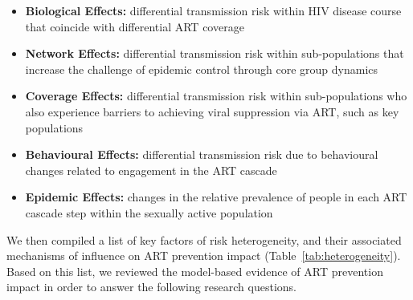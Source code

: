 \begin{itemize}
  \item \textbf{Biological Effects:}
  differential transmission risk within HIV disease course
  that coincide with differential ART coverage
  \cite{Pilcher2004}
  \item \textbf{Network Effects:}
  differential transmission risk within sub-populations
  that increase the challenge of epidemic control through core group dynamics
  \cite{Anderson1986,Boily1997,Watts2010}
  \item \textbf{Coverage Effects:}
  differential transmission risk within sub-populations
  who also experience barriers to achieving viral suppression via ART,
  such as key populations
  \cite{Mountain2014,Lancaster2016,Hakim2018}
  \item \textbf{Behavioural Effects:}
  differential transmission risk due to
  behavioural changes related to engagement in the ART cascade
  \cite{} %
  \item \textbf{Epidemic Effects:}
  changes in the relative prevalence of people in each ART cascade step
  within the sexually active population
  \cite{} %
\end{itemize}
We then compiled a list of key factors of risk heterogeneity,
and their associated mechanisms of influence on ART prevention impact
(Table~\ref{tab:heterogeneity}).
Based on this list, we reviewed the model-based evidence of ART prevention impact
in order to answer the following research questions.

